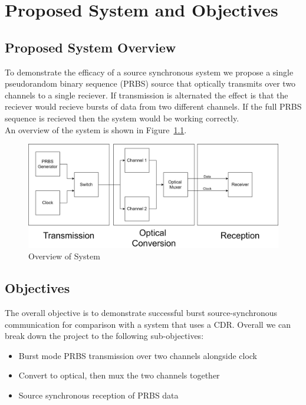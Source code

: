 \chapter{Proposed System and Objectives}

\section{Proposed System Overview}%
\label{sec:system_overview}
To demonstrate the efficacy of a source synchronous system we propose a single
pseudorandom binary sequence (PRBS) source that optically transmits over two
channels to a single reciever. If transmission is alternated the effect is that
the reciever would recieve bursts of data from two different channels. If the
full PRBS sequence is recieved then the system would be working correctly.\\ An
overview of the system is shown in Figure~\ref{fig:overview}. 

\begin{figure}[h]
    \centering
    \includegraphics[width=1\linewidth]{img/overview.png}
    \caption{Overview of System}%
    \label{fig:overview}
\end{figure}

\section{Objectives}%
\label{sec:objectives}
The overall objective is to demonstrate successful burst source-synchronous
communication for comparison with a system that uses a CDR.
\noindent
Overall we can break down the project to the following sub-objectives: 
\begin{itemize}
    \item Burst mode PRBS transmission over two channels alongside clock
    \item Convert to optical, then mux the two channels together
    \item Source synchronous reception of PRBS data 
\end{itemize}
